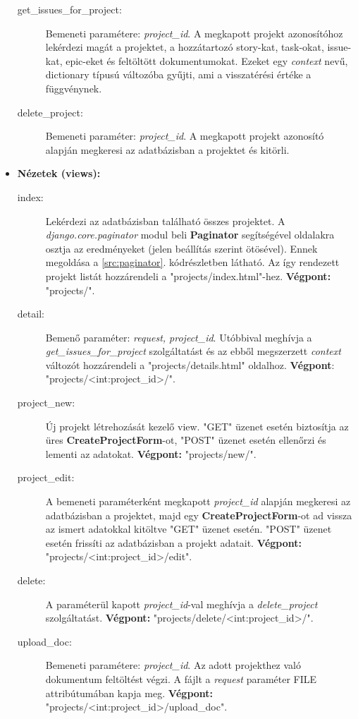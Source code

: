 \begin{itemize}
	\begin{description}
		\item[get\_issues\_for\_project:] Bemeneti paramétere: \textit{project\_id}. A megkapott projekt azonosítóhoz lekérdezi magát a projektet, a hozzátartozó story-kat, task-okat, issue-kat, epic-eket és feltöltött dokumentumokat. Ezeket egy \textit{context} nevű, dictionary típusú változóba gyűjti, ami a visszatérési értéke a függvénynek.
		\item[delete\_project:] Bemeneti paraméter: \textit{project\_id}. A megkapott projekt azonosító alapján megkeresi az adatbázisban a projektet és kitörli.
	\end{description}
	\item \textbf{Nézetek (views):}
	\begin{description}
		\item[index:] Lekérdezi az adatbázisban található összes projektet. A \textit{django.core.paginator} modul beli \textbf{Paginator} segítségével oldalakra osztja az eredményeket (jelen beállítás szerint ötösével). Ennek megoldása a \ref{src:paginator}. kódrészletben látható. Az így rendezett projekt listát hozzárendeli a "projects/index.html"-hez. \textbf{Végpont:} "projects/".
		\item[detail:] Bemenő paraméter: \textit{request, project\_id}. Utóbbival meghívja a \textit{get\_issues\_for\_project} szolgáltatást és az ebből megszerzett \textit{context} változót hozzárendeli a "projects/details.html" oldalhoz. \textbf{Végpont}: "projects/<int:project\_id>/".
		\item[project\_new:] Új projekt létrehozását kezelő view. "GET" üzenet esetén biztosítja az üres \textbf{CreateProjectForm}-ot, "POST" üzenet esetén ellenőrzi és lementi az adatokat. \textbf{Végpont:} "projects/new/".
		\item[project\_edit:] A bemeneti paraméterként megkapott \textit{project\_id} alapján megkeresi az adatbázisban a projektet, majd egy \textbf{CreateProjectForm}-ot ad vissza az ismert adatokkal kitöltve "GET" üzenet esetén. "POST" üzenet esetén frissíti az adatbázisban a projekt adatait. \textbf{Végpont:} "projects/<int:project\_id>/edit".
		\item[delete:] A paraméterül kapott \textit{project\_id}-val meghívja a \textit{delete\_project} szolgáltatást. \textbf{Végpont:} "projects/delete/<int:project\_id>/".
		\item[upload\_doc:] Bemeneti paramétere: \textit{project\_id}. Az adott projekthez való dokumentum feltöltést végzi. A fájlt a \textit{request} paraméter FILE attribútumában kapja meg. \textbf{Végpont:} "projects/<int:project\_id>/upload\_doc".

\end{description}
\end{itemize}
